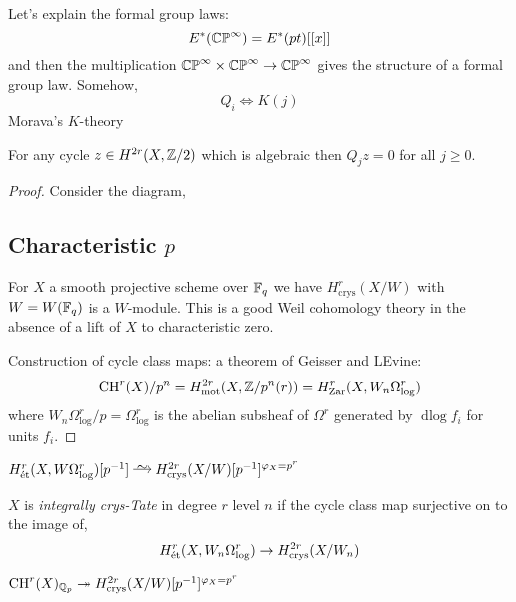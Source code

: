 \documentclass[12pt]{article}
\DeclareMathOperator{\dlog}{\mathrm{dlog}}
\begin{document}
Let's explain the formal group laws:
\[ E^*(\mathbb{CP}^\infty) = E^*(pt)[[x]] \]
and then the multiplication $\mathbb{CP}^\infty \times \mathbb{CP}^\infty \to \mathbb{CP}^\infty$ gives the structure of a formal group law. Somehow,
\[ Q_i \iff K(j) \]
Morava's $K$-theory

\begin{prop}
For any cycle $z \in H^{2r}(X, \mathbb{Z}/2)$ which is algebraic then $Q_j z = 0$ for all $j \ge 0$.
\end{prop}

\begin{proof}
Consider the diagram,
\begin{center}
\end{center}

\subsection{Characteristic $p$}

For $X$ a smooth projective scheme over $\mathbb{F}_q$ we have $H^r_{\text{crys}}(X/W)$ with $W = W(\mathbb{F}_q)$ is a $W$-module. This is a good Weil cohomology theory in the absence of a lift of $X$ to characteristic zero.

Construction of cycle class maps: a theorem of Geisser and LEvine:
\[ \mathrm{CH}^r(X) / p^n = H^{2r}_{\text{mot}}(X, \mathbb{Z}/p^n(r)) = H^r_{\text{Zar}}(X, W_n \Omega^r_{\log}) \]
where $W_n \Omega^r_{\log} / p = \Omega^r_{\log}$ is the abelian subsheaf of $\Omega^r$ generated by $\dlog{f_i}$ for units $f_i$.
\end{proof}


\begin{rmk}
$H^r_{\et}(X, W \Omega^r_{\log})[p^{-1}] \iso H^{2r}_{\text{crys}}(X/W)[p^{-1}]^{\varphi_X = p^r}$
\end{rmk}

\begin{defn}
$X$ is \textit{integrally crys-Tate} in degree $r$ level $n$ if the cycle class map surjective on to the image of,
\[ H^r_{\text{\'{e}t}}(X, W_n \Omega^r_{\log}) \to H^{2r}_{\text{crys}}(X/W_n) \]
\end{defn}

\newcommand{\Tate}{\mathrm{Tate}}

\begin{conj}[Tate]
$\mathrm{CH}^r(X)_{\mathbb{Q}_p} \twoheadrightarrow H^{2r}_{\text{crys}}(X/W)[p^{-1}]^{\varphi_X = p^r}$
\end{conj}
\end{document}
